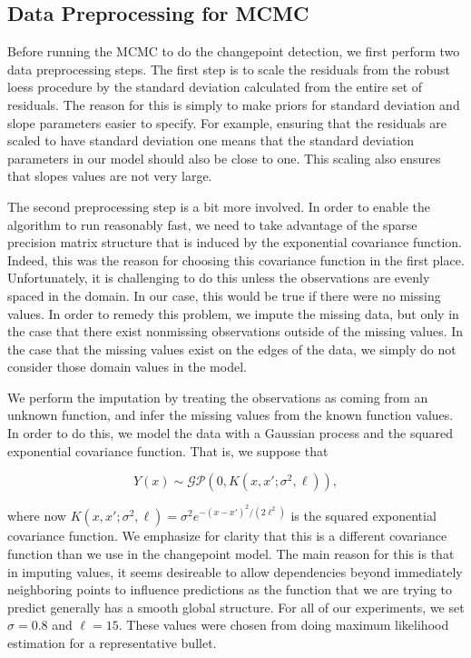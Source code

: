 \documentclass[12pt]{article}
\begin{document}
\subsection{Data Preprocessing for MCMC}

Before running the MCMC to do the changepoint detection, we first
perform two data preprocessing steps. The first step is to scale the
residuals from the robust loess procedure by the standard deviation
calculated from the entire set of residuals. The reason for this is
simply to make priors for standard deviation and slope parameters easier
to specify. For example, ensuring that the residuals are scaled to have
standard deviation one means that the standard deviation parameters in
our model should also be close to one. This scaling also ensures that
slopes values are not very large.

The second preprocessing step is a bit more involved. In order to enable
the algorithm to run reasonably fast, we need to take advantage of the
sparse precision matrix structure that is induced by the exponential
covariance function. Indeed, this was the reason for choosing this
covariance function in the first place. Unfortunately, it is challenging
to do this unless the observations are evenly spaced in the domain. In
our case, this would be true if there were no missing values. In order
to remedy this problem, we impute the missing data, but only in the case
that there exist nonmissing observations outside of the missing values.
In the case that the missing values exist on the edges of the data, we
simply do not consider those domain values in the model.

We perform the imputation by treating the observations as coming from an
unknown function, and infer the missing values from the known function
values. In order to do this, we model the data with a Gaussian process
and the squared exponential covariance function. That is, we suppose
that

\[
Y(x) \sim \mathcal{GP}(0, K(x,x';\sigma^2, \ell)),
\]

\noindent where now
\(K(x,x';\sigma^2, \ell) = \sigma^2 e^{-(x - x')^2/(2\ell^2)}\) is the
squared exponential covariance function. We emphasize for clarity that
this is a different covariance function than we use in the changepoint
model. The main reason for this is that in imputing values, it seems
desireable to allow dependencies beyond immediately neighboring points
to influence predictions as the function that we are trying to predict
generally has a smooth global structure. For all of our experiments, we
set \(\sigma = 0.8\) and \(\ell = 15\). These values were chosen from
doing maximum likelihood estimation for a representative bullet.
\end{document}
